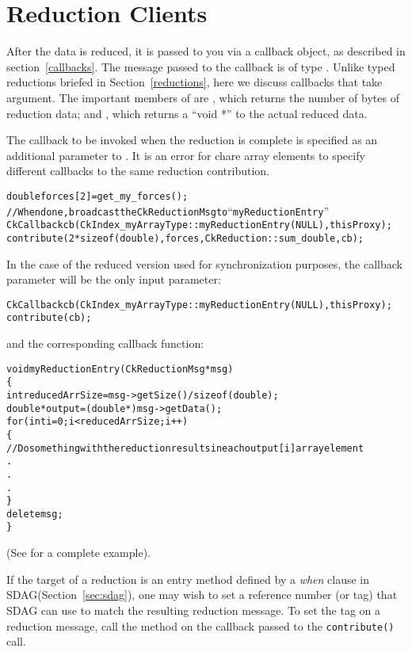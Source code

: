 \section{Reduction Clients}

\label{reductionClients}

After the data is reduced, it is passed to you via a callback object,
as described in section~\ref{callbacks}.  The message passed to
the callback is of type . Unlike typed reductions
briefed in Section~\ref{reductions}, here we discuss callbacks that take 
 argument.
The important members of  are
, which returns the number of bytes of reduction data; and
, which returns a ``void *'' to the actual reduced data.

The callback to be invoked when the reduction is complete is specified
as an additional parameter to . It is an error for chare array elements
to specify different callbacks to the same reduction contribution.
\begin{alltt}
    double forces[2]=get_my_forces();
    // When done, broadcast the CkReductionMsg to ``myReductionEntry''
    CkCallback cb(CkIndex_myArrayType::myReductionEntry(NULL), thisProxy);
    contribute(2*sizeof(double), forces,CkReduction::sum_double, cb);
\end{alltt}

In the case of the reduced version used for synchronization purposes, the
callback parameter will be the only input parameter:
\begin{alltt}
    CkCallback cb(CkIndex_myArrayType::myReductionEntry(NULL), thisProxy);
    contribute(cb);
\end{alltt}

and the corresponding callback function:

\begin{alltt}
void myReductionEntry(CkReductionMsg *msg)
\{
  int reducedArrSize=msg->getSize() / sizeof(double);
  double *output=(double *) msg->getData();
  for(int i=0 ; i<reducedArrSize ; i++)
  \{
   // Do something with the reduction results in each output[i] array element
   .
   .
   .
  \}
  delete msg;
\}
\end{alltt}

(See  for a complete example).

If the target of a reduction is an entry method defined by a
\emph{when} clause in SDAG(Section~\ref{sec:sdag}), one may wish to set a
reference number (or tag) that SDAG can use to match the resulting
reduction message. To set the tag on a reduction message, call the
 method on the callback passed
to the {\tt contribute()} call.

